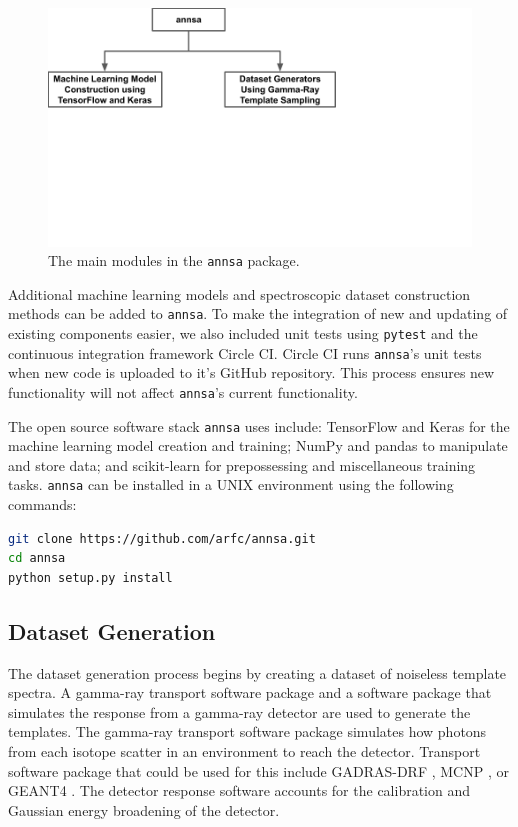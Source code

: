 \begin{figure}[H]
	\centering
	\includegraphics[trim=0 310 300 0,clip,width=0.8\linewidth]{images/annsa_structure}
	\caption{The main modules in the \texttt{annsa} package.}
	\label{fig:annsa_structure}
\end{figure}

Additional machine learning models and spectroscopic dataset construction methods can be added to \verb|annsa|. To make the integration of new and updating of existing components easier, we also included unit tests using \verb|pytest| \cite{pytest3.5} and the continuous integration framework Circle CI. Circle CI runs \verb|annsa|'s unit tests when new code is uploaded to it's GitHub repository. This process ensures new functionality will not affect \verb|annsa|'s current functionality.

The open source software stack \verb|annsa| uses include: TensorFlow \cite{tensorflow2015-whitepaper} and Keras \cite{chollet2015keras} for the machine learning model creation and training; NumPy \cite{numpy} and pandas \cite{mckinney-proc-scipy-2010} to manipulate and store data; and scikit-learn \cite{scikit-learn} for prepossessing and miscellaneous training tasks. \verb|annsa| can be installed in a UNIX environment using the following commands:
\begin{lstlisting}[language=bash, basicstyle={\small\ttfamily}]
git clone https://github.com/arfc/annsa.git
cd annsa
python setup.py install
\end{lstlisting}
\subsection{Dataset Generation} \label{section_dataset_gen}

The dataset generation process begins by creating a dataset of noiseless template spectra. A gamma-ray transport software package and a software package that simulates the response from a gamma-ray detector are used to generate the templates. The gamma-ray transport software package simulates how photons from each isotope scatter in an environment to reach the detector. Transport software package that could be used for this include GADRAS-DRF \cite{mitchell2014}, MCNP \cite{Goorley2016}, or GEANT4 \cite{geant4}. The detector response software accounts for the calibration and Gaussian energy broadening of the detector. 

